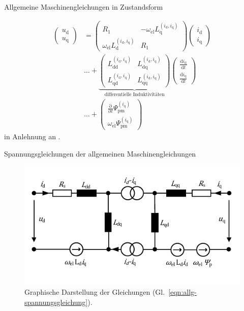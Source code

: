 \documentclass{beamer}
\newcommand{\x}[1]{\mathrm{#1}}
\begin{document}
\begin{frame}{Allgemeine Maschinengleichungen in Zustandsform}

\begin{align}
\left( \begin{array}{c} u_\x{d} \\ u_\x{q} \end{array} \right) &= \left( \begin{array}{cc} R_\x{1} & -\omega_\x{el}L_\x{q}^{(i_\x{d},i_\x{q})} \\ \omega_\x{el}L_\x{d}^{(i_\x{d},i_\x{q})} & R_\x{1} \end{array} \right) \left(\begin{array}{c} i_\x{d} \\ i_\x{q} \end{array}\right) \label{eqn:allg-spannungsgleichung} \\ 
 &\ldots + \underbrace{\left( \begin{array}{cc} L_\x{dd}^{(i_\x{d},i_\x{q})} & L_\x{dq}^{(i_\x{d},i_\x{q})} \\ L_\x{qd}^{(i_\x{d},i_\x{q})} & L_\x{qq}^{(i_\x{d},i_\x{q})} \end{array}\right)}_{\text{differentielle Induktivitäten}} \left(\begin{array}{c} \frac{\x{d}i_\x{d}}{\x{d}t} \\ \frac{\x{d}i_\x{q}}{\x{d}t} \end{array} \right) \nonumber \\ 
& \ldots + \left( \begin{array}{c} \frac{\x{\partial}}{\x{\partial }t} \Psi_\x{pm}^{(i_\x{q})} \\ \omega_\x{el} \Psi_\x{pm}^{(i_\x{q})} \nonumber \end{array}  \right) \nonumber
\end{align}
in Anlehnung an \autocite{Kellner2012}.
\end{frame}

\begin{frame}[plain]{Spannungsgleichungen der allgemeinen Maschinengleichungen}
\begin{figure}[!h]
\centering
\includegraphics[width=\textwidth]{img/allg-spannungsgleichung}
\caption{Graphische Darstellung der Gleichungen (Gl.~\ref{eqn:allg-spannungsgleichung}).}
\label{fig:allg-spannungsgleichung}
\end{figure}
\end{frame}
\end{document}
